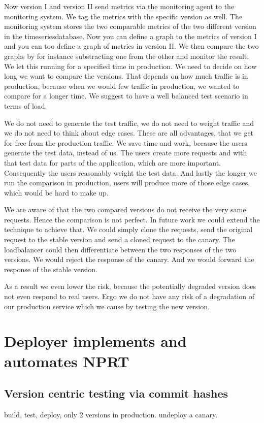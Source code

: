Now version I and version II send metrics via the monitoring agent to the monitoring
system. We tag the metrics with the specific version as well. The monitoring system stores
the two comparable metrics of the two different version in the timeseriesdatabase. Now you
can define a graph to the metrics of version I and you can too define a graph of metrics
in version II. We then compare the two graphs by for instance substracting one from the
other and monitor the result. We let this running for a specified time in production. We
need to decide on how long we want to compare the versions. That depends on how much
traffic is in production, because when we would few traffic in production, we wanted to
compare for a longer time. We suggest to have a well balanced test scenario in terms of
load.

We do not need to generate the test traffic, we do not need to weight traffic and we do
not need to think about edge cases. These are all advantages, that we get for free from
the production traffic. We save time and work, because the users generate the test data,
instead of us. The users create more requests and with that test data for parts of the
application, which are more important. Consequently the users reasonably weight the test
data. And lastly the longer we run the comparison in production, users will produce more
of those edge cases, which would be hard to make up.

We are aware of that the two compared versions do not receive the very same
requests. Hence the comparison is not perfect. In future work we could extend the
technique to achieve that. We could simply clone the requests, send the original request
to the stable version and send a cloned request to the canary. The loadbalancer could then
differentiate between the two responses of the two versions. We would reject the response
of the canary. And we would forward the response of the stable version.

As a result we even lower the risk, because the potentially degraded version does not even
respond to real users. Ergo we do not have any risk of a degradation of our production
service which we cause by testing the new version.


\chapter{Deployer implements and automates NPRT}
\section{Version centric testing via commit hashes}
build, test, deploy, only 2 versions in production. undeploy a canary.
